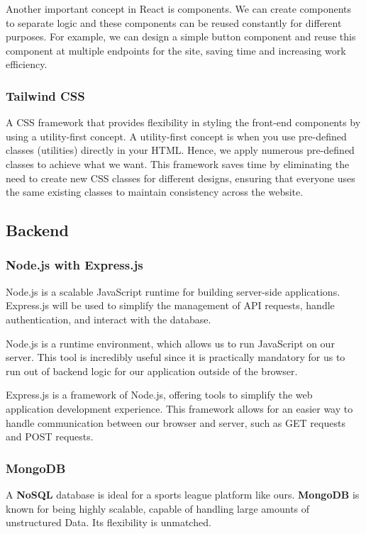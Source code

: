 \documentclass{article}
\begin{document}
Another important concept in React is components. We can create components to separate logic and these components can be reused constantly for different purposes. For example, we can design a simple button component and reuse this component at multiple endpoints for the site, saving time and increasing work efficiency.

\subsubsection*{Tailwind CSS}
A CSS framework that provides flexibility in styling the front-end components by using a utility-first concept. A utility-first concept is when you use pre-defined classes (utilities) directly in your HTML. Hence, we apply numerous pre-defined classes to achieve what we want. This framework saves time by eliminating the need to create new CSS classes for different designs, ensuring that everyone uses the same existing classes to maintain consistency across the website.

\subsection{Backend}
\subsubsection*{Node.js with Express.js}
Node.js is a scalable JavaScript runtime for building server-side applications. Express.js will be used to simplify the management of API requests, handle authentication, and interact with the database.

Node.js is a runtime environment, which allows us to run JavaScript on our server. This tool is incredibly useful since it is practically mandatory for us to run out of backend logic for our application outside of the browser.

Express.js is a framework of Node.js, offering tools to simplify the web application development experience. This framework allows for an easier way to handle communication between our browser and server, such as GET requests and POST requests.

\subsubsection*{MongoDB}
A \textbf{NoSQL} database is ideal for a sports league platform like ours. \textbf{MongoDB} is known for being highly scalable, capable of handling large amounts of unstructured Data. Its flexibility is unmatched.
\end{document}
